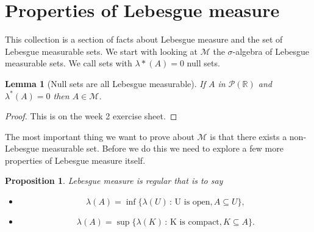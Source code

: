 \documentclass[
]{book}
\providecommand{\tightlist}{%
  \setlength{\itemsep}{0pt}\setlength{\parskip}{0pt}}
\newtheorem{lemma}{Lemma}[chapter]
\newtheorem{proposition}{Proposition}[chapter]
\theoremstyle{definition}
\theoremstyle{definition}
\theoremstyle{definition}
\theoremstyle{definition}
\theoremstyle{remark}
\begin{document}
\hypertarget{properties-of-lebesgue-measure}{%
\section{Properties of Lebesgue measure}\label{properties-of-lebesgue-measure}}

This collection is a section of facts about Lebesgue measure and the set of Lebesgue measurable sets. We start with looking at \(\mathscr{M}\) the \(\sigma\)-algebra of Lebesgue measurable sets. We call sets with \(\lambda*(A)=0\) null sets.

\begin{lemma}[Null sets are all Lebesgue measurable]
If \(A\) in \(\mathscr{P}(\mathbb{R})\) and \(\lambda^*(A) =0\) then \(A \in \mathscr{M}\).
\end{lemma}

\begin{proof}
This is on the week 2 exercise sheet.
\end{proof}

The most important thing we want to prove about \(\mathscr{M}\) is that there exists a non-Lebesgue measurable set. Before we do this we need to explore a few more properties of Lebesgue measure itself.

\begin{proposition}

Lebesgue measure is \emph{regular} that is to say

\begin{itemize}
\tightlist
\item
  \[\lambda(A) = \inf \{ \lambda(U)\,:\, \mbox{U is open}, A \subseteq U\},\]
\item
  \[\lambda(A) = \sup \{ \lambda(K)\,:\, \mbox{K is compact}, K \subseteq A\}.\]
\end{itemize}

\end{proposition}
\end{document}
